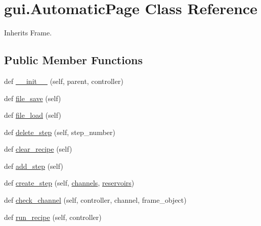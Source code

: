 \hypertarget{classgui_1_1_automatic_page}{}\section{gui.\+Automatic\+Page Class Reference}
\label{classgui_1_1_automatic_page}


Inherits Frame.

\subsection*{Public Member Functions}
\begin{DoxyCompactItemize}
\item 
def \mbox{\hyperlink{classgui_1_1_automatic_page_a2593e7e7ab658cd0ba4a216f4085eba4}{\+\_\+\+\_\+init\+\_\+\+\_\+}} (self, parent, controller)
\item 
def \mbox{\hyperlink{classgui_1_1_automatic_page_a010e9407e8dccee9b2fe19def99ad4e9}{file\+\_\+save}} (self)
\item 
def \mbox{\hyperlink{classgui_1_1_automatic_page_ad4b9b8d05eba7460d0d4069223959459}{file\+\_\+load}} (self)
\item 
def \mbox{\hyperlink{classgui_1_1_automatic_page_aa223d0d34f4a5153ad036c521efc4008}{delete\+\_\+step}} (self, step\+\_\+number)
\item 
def \mbox{\hyperlink{classgui_1_1_automatic_page_ab4866c171e0c3f6c4d2911f0fe5c6b03}{clear\+\_\+recipe}} (self)
\item 
def \mbox{\hyperlink{classgui_1_1_automatic_page_a6b83df77949c781d9e13156faa82f8b5}{add\+\_\+step}} (self)
\item 
def \mbox{\hyperlink{classgui_1_1_automatic_page_ac1f38c3fd742bcbf0a936639283330f0}{create\+\_\+step}} (self, \mbox{\hyperlink{classgui_1_1_automatic_page_a0527c3c09f8e591b8cb46ec926b23cf0}{channels}}, \mbox{\hyperlink{classgui_1_1_automatic_page_a637c9f8cc178c00046d28b3f6751b5ef}{reservoirs}})
\item 
def \mbox{\hyperlink{classgui_1_1_automatic_page_a17f4d7d7431114b208912620caa78af6}{check\+\_\+channel}} (self, controller, channel, frame\+\_\+object)
\item 
def \mbox{\hyperlink{classgui_1_1_automatic_page_ac239f947c6933ed3fdc11c5131c791c1}{run\+\_\+recipe}} (self, controller)
\end{DoxyCompactItemize}
